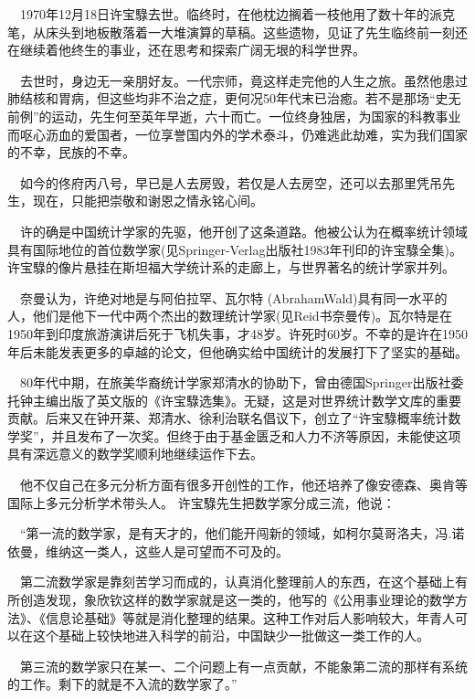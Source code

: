 \begin{frame}
	$\quad$1970年12月18日许宝騄去世。临终时，在他枕边搁着一枝他用了数十年的派克笔，从床头到地板散落着一大堆演算的草稿。这些遗物，见证了先生临终前一刻还在继续着他终生的事业，还在思考和探索广阔无垠的科学世界。
	
	$\quad$去世时，身边无一亲朋好友。一代宗师，竟这样走完他的人生之旅。虽然他患过肺结核和胃病，但这些均非不治之症，更何况50年代末已治癒。若不是那场“史无前例”的运动，先生何至英年早逝，六十而亡。一位终身独居，为国家的科教事业而呕心沥血的爱国者，一位享誉国内外的学术泰斗，仍难逃此劫难，实为我们国家的不幸，民族的不幸。
	
	$\quad$如今的佟府丙八号，早已是人去房毁，若仅是人去房空，还可以去那里凭吊先生，现在，只能把崇敬和谢恩之情永铭心间。
\end{frame}

\begin{frame}
	$\quad$许的确是中国统计学家的先驱，他开创了这条道路。他被公认为在概率统计领域具有国际地位的首位数学家(见Springer-Verlag出版社1983年刊印的许宝騄全集)。许宝騄的像片悬挂在斯坦福大学统计系的走廊上，与世界著名的统计学家并列。
	
	$\quad$奈曼认为，许绝对地是与阿伯拉罕、瓦尔特 (AbrahamWald)具有同一水平的人，他们是他下一代中两个杰出的数理统计学家(见Reid书奈曼传)。瓦尔特是在1950年到印度旅游演讲后死于飞机失事，才48岁。许死时60岁。不幸的是许在1950年后未能发表更多的卓越的论文，但他确实给中国统计的发展打下了坚实的基础。
	
	$\quad$80年代中期，在旅美华裔统计学家郑清水的协助下，曾由德国Springer出版社委托钟主编出版了英文版的《许宝騄选集》。无疑，这是对世界统计数学文库的重要贡献。后来又在钟开莱、郑清水、徐利治联名倡议下，创立了“许宝騄概率统计数学奖”，并且发布了一次奖。但终于由于基金匮乏和人力不济等原因，未能使这项具有深远意义的数学奖顺利地继续运作下去。 
	
\end{frame}

\begin{frame}
	$\quad$他不仅自己在多元分析方面有很多开创性的工作，他还培养了像安德森、奥肯等国际上多元分析学术带头人。
	许宝騄先生把数学家分成三流，他说：
	
	$\quad$“第一流的数学家，是有天才的，他们能开闯新的领域，如柯尔莫哥洛夫，冯.诺依曼，维纳这一类人，这些人是可望而不可及的。
	
	$\quad$第二流数学家是靠刻苦学习而成的，认真消化整理前人的东西，在这个基础上有所创造发现，象欣钦这样的数学家就是这一类的，他写的《公用事业理论的数学方法》、《信息论基础》等就是消化整理的结果。这种工作对后人影响较大，年青人可以在这个基础上较快地进入科学的前沿，中国缺少一批做这一类工作的人。
	
	$\quad$第三流的数学家只在某一、二个问题上有一点贡献，不能象第二流的那样有系统的工作。剩下的就是不入流的数学家了。”
	
\end{frame}


